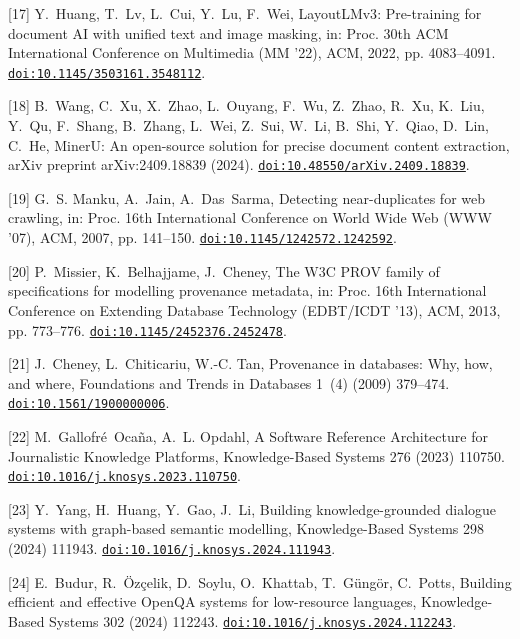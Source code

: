 [17] Y.~Huang, T.~Lv, L.~Cui, Y.~Lu, F.~Wei, {LayoutLMv3}: Pre-training for document {AI} with unified text and image masking, in: Proc. 30th ACM International Conference on Multimedia (MM '22), ACM, 2022, pp. 4083--4091. \href {https://doi.org/10.1145/3503161.3548112} {\texttt{doi:10.1145/3503161.3548112}}.

[18] B.~Wang, C.~Xu, X.~Zhao, L.~Ouyang, F.~Wu, Z.~Zhao, R.~Xu, K.~Liu, Y.~Qu, F.~Shang, B.~Zhang, L.~Wei, Z.~Sui, W.~Li, B.~Shi, Y.~Qiao, D.~Lin, C.~He, {MinerU}: An open-source solution for precise document content extraction, arXiv preprint arXiv:2409.18839 (2024). \href {https://doi.org/10.48550/arXiv.2409.18839} {\texttt{doi:10.48550/arXiv.2409.18839}}.

[19] G.~S. Manku, A.~Jain, A.~Das~Sarma, Detecting near-duplicates for web crawling, in: Proc. 16th International Conference on World Wide Web (WWW '07), ACM, 2007, pp. 141--150. \href {https://doi.org/10.1145/1242572.1242592} {\texttt{doi:10.1145/1242572.1242592}}.

[20] P.~Missier, K.~Belhajjame, J.~Cheney, The {W3C} {PROV} family of specifications for modelling provenance metadata, in: Proc. 16th International Conference on Extending Database Technology (EDBT/ICDT '13), ACM, 2013, pp. 773--776. \href {https://doi.org/10.1145/2452376.2452478} {\texttt{doi:10.1145/2452376.2452478}}.

[21] J.~Cheney, L.~Chiticariu, W.-C. Tan, Provenance in databases: Why, how, and where, Foundations and Trends in Databases 1~(4) (2009) 379--474. \href {https://doi.org/10.1561/1900000006} {\texttt{doi:10.1561/1900000006}}.

[22] M.~Gallofr{\'e}~Oca{\~n}a, A.~L. Opdahl, {A Software Reference Architecture for Journalistic Knowledge Platforms}, Knowledge-Based Systems 276 (2023) 110750. \href {https://doi.org/10.1016/j.knosys.2023.110750} {\texttt{doi:10.1016/j.knosys.2023.110750}}.

[23] Y.~Yang, H.~Huang, Y.~Gao, J.~Li, {Building knowledge-grounded dialogue systems with graph-based semantic modelling}, Knowledge-Based Systems 298 (2024) 111943. \href {https://doi.org/10.1016/j.knosys.2024.111943} {\texttt{doi:10.1016/j.knosys.2024.111943}}.

[24] E.~Budur, R.~{\"O}z{\c{c}}elik, D.~Soylu, O.~Khattab, T.~G{\"u}ng{\"o}r, C.~Potts, {Building efficient and effective OpenQA systems for low-resource languages}, Knowledge-Based Systems 302 (2024) 112243. \href {https://doi.org/10.1016/j.knosys.2024.112243} {\texttt{doi:10.1016/j.knosys.2024.112243}}.

